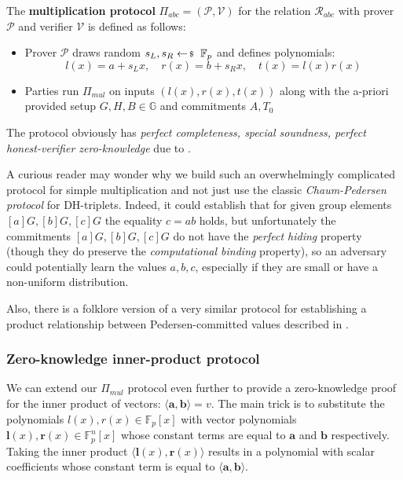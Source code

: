 \documentclass[../lecture-notes-148x210.tex]{subfiles}
\begin{document}
\begin{definition}
    The \textbf{multiplication protocol} $\Pi_{abc} = (\mathcal{P,V})$ for the relation $\mathcal{R}_{abc}$ with prover $\mathcal{P}$ and verifier $\mathcal{V}$ is defined as follows:
    \begin{itemize}
        \item Prover $\mathcal{P}$ draws random $s_L, s_R \leftarrowS \mathbb{F}_p$ and defines polynomials: $$l(x)=a+s_L x,\quad r(x)=b+s_R x,\quad t(x)=l(x)r(x)$$
        \item Parties run $\Pi_{mul}$ on inputs $(l(x),r(x),t(x))$ along with the a-priori provided setup $G,H,B \in \mathbb{G}$ and commitments $A, T_0$
    \end{itemize}
\end{definition}
The protocol obviously has \textit{perfect completeness, special soundness, perfect honest-verifier zero-knowledge} due to .

\begin{remark} %
    A curious reader may wonder why we build such an overwhelmingly complicated protocol for simple multiplication and not just use the classic \textit{Chaum-Pedersen protocol} for DH-triplets. Indeed, it could establish that for given group elements $[a]G, [b]G, [c]G$ the equality $c=ab$ holds, but unfortunately the commitments $[a]G, [b]G, [c]G$ do not have the \textit{perfect hiding} property (though they do preserve the \textit{computational binding} property), so an adversary could potentially learn the values $a,b,c$, especially if they are small or have a non-uniform distribution.
\end{remark}

Also, there is a folklore version of a very similar protocol for establishing a product relationship between Pedersen-committed values described in \cite[section 12]{thaler2022proofs}.

\subsubsection{Zero-knowledge inner-product protocol}

We can extend our $\Pi_{mul}$ protocol even further to provide a zero-knowledge proof for the inner product of vectors: $\langle \mathbf{a, b} \rangle = v$. The main trick is to substitute the polynomials $l(x), r(x) \in \mathbb{F}_p[x]$ with vector polynomials $\mathbf{l}(x), \mathbf{r}(x) \in \mathbb{F}_p^n[x]$ whose constant terms are equal to $\mathbf{a}$ and $\mathbf{b}$ respectively. Taking the inner product $\langle \mathbf{l}(x), \mathbf{r}(x) \rangle$ results in a polynomial with scalar coefficients whose constant term is equal to $\langle \mathbf{a, b} \rangle$.
\end{document}
